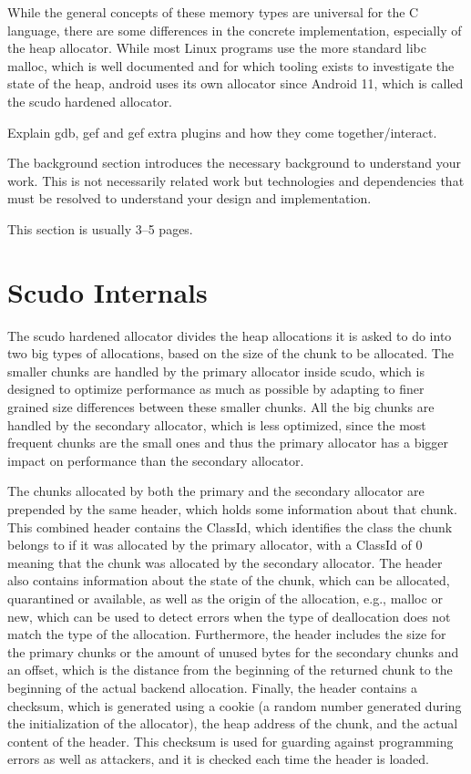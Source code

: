 \documentclass[a4paper,11pt,oneside]{report}
\begin{document}
While the general concepts of these memory types are universal for the C language,
there are some differences in the concrete implementation, especially of the heap
allocator. While most Linux programs use the more standard libc malloc, which is
well documented and for which tooling exists to investigate the state of the heap,
android uses its own allocator since Android 11, which is called the scudo
hardened allocator.

Explain gdb, gef and gef extra plugins and how they come together/interact.



The background section introduces the necessary background to understand your
work. This is not necessarily related work but technologies and dependencies
that must be resolved to understand your design and implementation.

This section is usually 3–5 pages.


\chapter{Scudo Internals}

The scudo hardened allocator divides the heap allocations it is asked to do into
two big types of allocations, based on the size of the chunk to be allocated.
The smaller chunks are handled by the primary allocator inside scudo, which is
designed to optimize performance as much as possible by adapting to finer grained
size differences between these smaller chunks. All the big chunks are handled by
the secondary allocator, which is less optimized, since the most frequent chunks
are the small ones and thus the primary allocator has a bigger impact on performance
than the secondary allocator.

The chunks allocated by both the primary and the secondary allocator are prepended
by the same header, which holds some information about that chunk. This combined
header contains the ClassId, which identifies the class the chunk belongs to if
it was allocated by the primary allocator, with a ClassId of 0 meaning that the
chunk was allocated by the secondary allocator. The header also contains information
about the state of the chunk, which can be allocated, quarantined or available, as
well as the origin of the allocation, e.g., malloc or new, which can be used to
detect errors when the type of deallocation does not match the type of the
allocation. Furthermore, the header includes the size for the primary chunks or
the amount of unused bytes for the secondary chunks and an offset, which is the
distance from the beginning of the returned chunk to the beginning of the actual
backend allocation. Finally, the header contains a checksum, which is generated
using a cookie (a random number generated during the initialization of the
allocator), the heap address of the chunk, and the actual content of the header.
This checksum is used for guarding against programming errors as well as attackers,
and it is checked each time the header is loaded.
\end{document}
